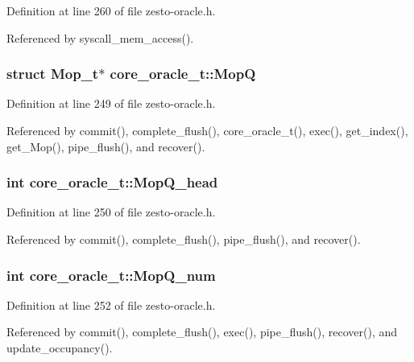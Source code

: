 Definition at line 260 of file zesto-oracle.h.

Referenced by syscall\_\-mem\_\-access().
\subsubsection[{MopQ}]{\setlength{\rightskip}{0pt plus 5cm}struct {\bf Mop\_\-t}$\ast$ {\bf core\_\-oracle\_\-t::MopQ}\hspace{0.3cm}{\tt  [read, protected]}}\label{classcore__oracle__t_ce39de7d819c6a08c18fce9294162dad}




Definition at line 249 of file zesto-oracle.h.

Referenced by commit(), complete\_\-flush(), core\_\-oracle\_\-t(), exec(), get\_\-index(), get\_\-Mop(), pipe\_\-flush(), and recover().
\subsubsection[{MopQ\_\-head}]{\setlength{\rightskip}{0pt plus 5cm}int {\bf core\_\-oracle\_\-t::MopQ\_\-head}\hspace{0.3cm}{\tt  [protected]}}\label{classcore__oracle__t_70cbf1e1615f32f3f61216ef002aba42}




Definition at line 250 of file zesto-oracle.h.

Referenced by commit(), complete\_\-flush(), pipe\_\-flush(), and recover().
\subsubsection[{MopQ\_\-num}]{\setlength{\rightskip}{0pt plus 5cm}int {\bf core\_\-oracle\_\-t::MopQ\_\-num}\hspace{0.3cm}{\tt  [protected]}}\label{classcore__oracle__t_c5e34c6486de6628dec11dae6b6139ef}




Definition at line 252 of file zesto-oracle.h.

Referenced by commit(), complete\_\-flush(), exec(), pipe\_\-flush(), recover(), and update\_\-occupancy().
